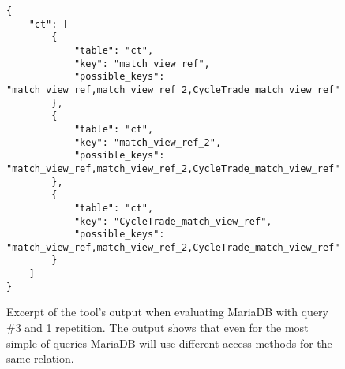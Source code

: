 \begin{figure}[ht]
  \begin{verbatim}
{
    "ct": [
        {
            "table": "ct",
            "key": "match_view_ref",
            "possible_keys": "match_view_ref,match_view_ref_2,CycleTrade_match_view_ref"
        },
        {
            "table": "ct",
            "key": "match_view_ref_2",
            "possible_keys": "match_view_ref,match_view_ref_2,CycleTrade_match_view_ref"
        },
        {
            "table": "ct",
            "key": "CycleTrade_match_view_ref",
            "possible_keys": "match_view_ref,match_view_ref_2,CycleTrade_match_view_ref"
        }
    ]
}
\end{verbatim}
  \caption[Excerpt of the tool's output for MariaDB, query \#3 and 1
  repetition.]{Excerpt of the tool's output when evaluating MariaDB with query
    \#3 and 1 repetition. The output shows that even for the most simple of
    queries MariaDB will use different access methods for the same relation.}\label{fig:json:eval2:test3:mariadb}
\end{figure}

